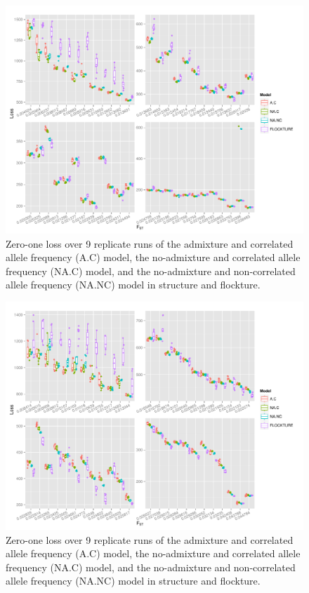   \begin{figure}
\centering
\includegraphics[width=.9\linewidth]{images/Figures-Pat/uSatloss.pdf}%
  \caption{Zero-one loss over 9 replicate runs of the admixture and correlated allele 
  frequency (A.C) model, 
the no-admixture and correlated allele frequency (NA.C) model, 
and the no-admixture and non-correlated allele frequency (NA.NC) model in {\sc structure} and {\sc flockture}.}
  \label{fig:uSatLoss}
\end{figure} 

 \begin{figure}
\centering
  \includegraphics[width=.9\linewidth]{images/Figures-Pat/SNPloss.pdf}%
  \caption{Zero-one loss over 9 replicate runs of the admixture and correlated allele 
  frequency (A.C) model, 
the no-admixture and correlated allele frequency (NA.C) model, 
and the no-admixture and non-correlated allele frequency (NA.NC) model in {\sc structure} and {\sc flockture}.}
  \label{fig:SNPloss}
\end{figure} 


